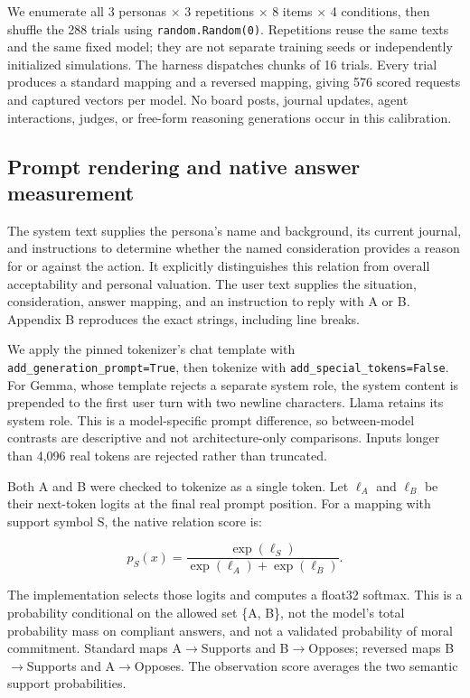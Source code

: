 We enumerate all 3 personas \ensuremath{\times} 3 repetitions \ensuremath{\times} 8 items \ensuremath{\times} 4 conditions, then shuffle the 288 trials using \texttt{random.Random(0)}. Repetitions reuse the same texts and the same fixed model; they are not separate training seeds or independently initialized simulations. The harness dispatches chunks of 16 trials. Every trial produces a standard mapping and a reversed mapping, giving 576 scored requests and captured vectors per model. No board posts, journal updates, agent interactions, judges, or free-form reasoning generations occur in this calibration.

\subsection{Prompt rendering and native answer measurement}\label{prompt-rendering-and-native-answer-measurement}

The system text supplies the persona's name and background, its current journal, and instructions to determine whether the named consideration provides a reason for or against the action. It explicitly distinguishes this relation from overall acceptability and personal valuation. The user text supplies the situation, consideration, answer mapping, and an instruction to reply with A or B. Appendix B reproduces the exact strings, including line breaks.

We apply the pinned tokenizer's chat template with \nolinkurl{add_generation_prompt=True}, then tokenize with \nolinkurl{add_special_tokens=False}. For Gemma, whose template rejects a separate system role, the system content is prepended to the first user turn with two newline characters. Llama retains its system role. This is a model-specific prompt difference, so between-model contrasts are descriptive and not architecture-only comparisons. Inputs longer than 4,096 real tokens are rejected rather than truncated.

Both A and B were checked to tokenize as a single token. Let \(\ell_{A}\) and \(\ell_{B}\) be their next-token logits at the final real prompt position. For a mapping with support symbol S, the native relation score is:

\begin{equation}\label{eq:native}
p_S(x)=\frac{\exp(\ell_S)}{\exp(\ell_A)+\exp(\ell_B)}.
\end{equation}

The implementation selects those logits and computes a float32 softmax. This is a probability conditional on the allowed set \{A, B\}, not the model's total probability mass on compliant answers, and not a validated probability of moral commitment. Standard maps A\ensuremath{\rightarrow}Supports and B\ensuremath{\rightarrow}Opposes; reversed maps B\ensuremath{\rightarrow}Supports and A\ensuremath{\rightarrow}Opposes. The observation score averages the two semantic support probabilities.

